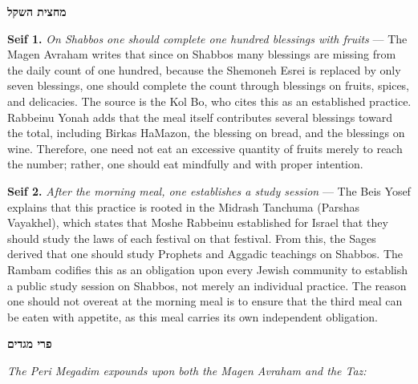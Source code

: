 \documentclass[11pt,letterpaper,openany]{scrbook}
\begin{document}
\begin{sloppypar}
\begin{machatzitbox}
{\commentaryfont\fontsize{9}{11}\selectfont\textcolor{hcolor}{\textbf{\texthebrew{מחצית השקל}}}}\par\smallskip
\begin{minipage}[t]{0.48\textwidth}
\textbf{Seif 1.} \textit{On Shabbos one should complete one hundred blessings with fruits} --- The Magen Avraham writes that since on Shabbos many blessings are missing from the daily count of one hundred, because the Shemoneh Esrei is replaced by only seven blessings, one should complete the count through blessings on fruits, spices, and delicacies. The source is the Kol Bo, who cites this as an established practice. Rabbeinu Yonah adds that the meal itself contributes several blessings toward the total, including Birkas HaMazon, the blessing on bread, and the blessings on wine. Therefore, one need not eat an excessive quantity of fruits merely to reach the number; rather, one should eat mindfully and with proper intention.
\end{minipage}%
\hfill
\begin{minipage}[t]{0.48\textwidth}
\textbf{Seif 2.} \textit{After the morning meal, one establishes a study session} --- The Beis Yosef explains that this practice is rooted in the Midrash Tanchuma (Parshas Vayakhel), which states that Moshe Rabbeinu established for Israel that they should study the laws of each festival on that festival. From this, the Sages derived that one should study Prophets and Aggadic teachings on Shabbos. The Rambam codifies this as an obligation upon every Jewish community to establish a public study session on Shabbos, not merely an individual practice. The reason one should not overeat at the morning meal is to ensure that the third meal can be eaten with appetite, as this meal carries its own independent obligation.
\end{minipage}
\end{machatzitbox}

\vspace{3pt}

\begin{tcolorbox}[
  colback=periMegadimBlue, colframe=periMegadimBlue!60!black,
  fontupper=\engfont\fontsize{9.5}{12}\selectfont,
  boxrule=0.5pt, arc=1pt,
  top=3pt, bottom=3pt, left=4pt, right=4pt
]
{\commentaryfont\fontsize{9}{11}\selectfont\textcolor{hcolor}{\textbf{\texthebrew{פרי מגדים}}}}\par\smallskip
\textit{The Peri Megadim expounds upon both the Magen Avraham and the Taz:}
\end{tcolorbox}


\end{sloppypar}
\end{document}
